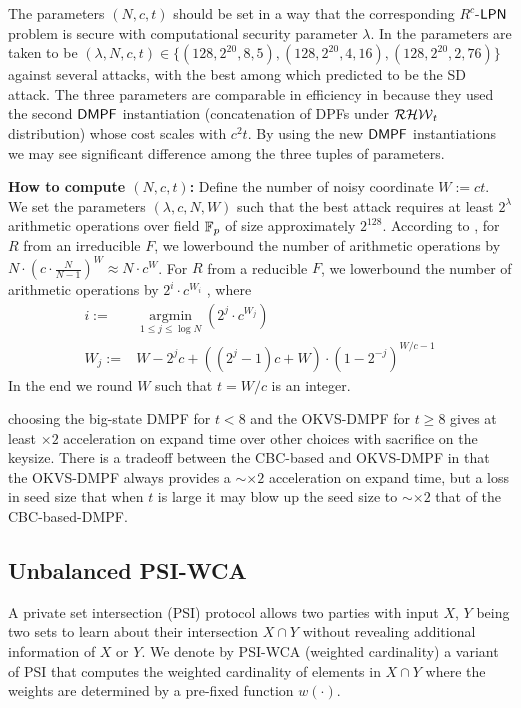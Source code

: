 The parameters $(N, c, t)$ should be set in a way that the corresponding $R^c$-${\sf LPN}$ problem is secure with computational security parameter $\lambda$. In \cite{cryptoeprint:2022/1035} the parameters are taken to be $(\lambda, N, c, t) \in\{ (128, 2^{20}, 8, 5), (128, 2^{20}, 4, 16), (128, 2^{20}, 2, 76)\}$ against several attacks, with the best among which predicted to be the SD attack. The three parameters are comparable in efficiency in \cite{cryptoeprint:2022/1035} because they used the second ${\sf DMPF}$ instantiation (concatenation of DPFs under $\mathcal{RHW}_t$ distribution) whose cost scales with $c^2t$. By using the new ${\sf DMPF}$ instantiations we may see significant difference among the three tuples of parameters. 

\textbf{How to compute $(N,c,t)$: }Define the number of noisy coordinate $W:=ct$. We set the parameters $(\lambda, c, N, W)$ such that the best attack requires at least $2^\lambda$ arithmetic operations over field $\mathbb{F}_p$ of size approximately $2^{128}$. According to \cite{cryptoeprint:2022/1035}, for $R$ from an irreducible $F$, we lowerbound the number of arithmetic operations by $N\cdot (c\cdot \frac{N}{N-1})^W\approx N\cdot c^W$.  For $R$ from a reducible $F$, we lowerbound the number of arithmetic operations by $2^i\cdot c^{W_i}$ , where 
\[
  \begin{split}
    i:=&\mathop{\arg\min}\limits_{1\le j\le \log N}\left(2^j\cdot c^{W_j}\right)\\ W_j:=&W-2^jc+((2^j-1)c+W)\cdot \left(1-2^{-j}\right)^{W/c-1}
  \end{split}
\]
 In the end we round $W$ such that $t=W/c$ is an integer. 


 choosing the big-state DMPF for $t<8$ and the OKVS-DMPF for $t\ge 8$ gives at least $\times 2$ acceleration on expand time over other choices with sacrifice on the keysize. There is a tradeoff between the CBC-based and OKVS-DMPF in that the OKVS-DMPF always provides a $\sim\times 2$ acceleration on expand time, but a loss in seed size that when $t$ is large it may blow up the seed size to $\sim \times 2$ that of the CBC-based-DMPF. 

\subsection{Unbalanced PSI-WCA}
A private set intersection (PSI) protocol allows two parties with input $X$, $Y$ being two sets to learn about their intersection $X\cap Y$ without revealing additional information of $X$ or $Y$. We denote by PSI-WCA (weighted cardinality) a variant of PSI that computes the weighted cardinality of elements in $X\cap Y$ where the weights are determined by a pre-fixed function $w(\cdot)$. 

